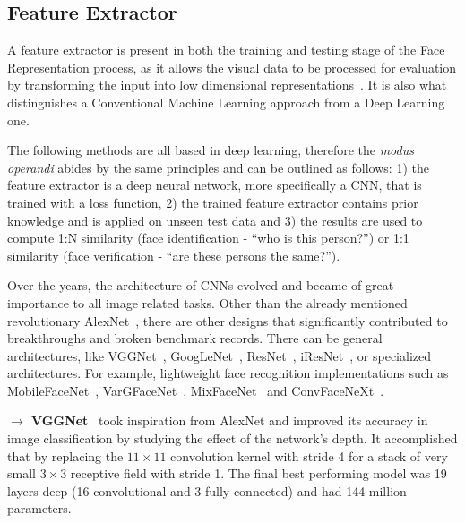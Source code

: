 \documentclass[class=report, crop=false, a4paper, 12pt]{standalone}
\begin{document}
\subsection{Feature Extractor}
A feature extractor is present in both the training and testing stage of the Face Representation process, as it allows the visual data to be processed for evaluation by transforming the input into low dimensional representations~\autocite{lecunGradientBasedLearningApplied1998}. It is also what distinguishes a Conventional Machine Learning approach from a Deep Learning one.  
\par The following methods are all based in deep learning, therefore the \textit{modus operandi} abides by the same principles and can be outlined as follows: 1) the feature extractor is a deep neural network, more specifically a CNN, that is trained with a loss function, 2) the trained feature extractor contains prior knowledge and is applied on unseen test data and 3) the results are used to compute 1:N similarity (face identification - ``who is this person?'') or 1:1 similarity (face verification - ``are these persons the same?'').
\par Over the years, the architecture of CNNs evolved and became of great importance to all image related tasks. Other than the already mentioned revolutionary AlexNet~\autocite{krizhevskyImageNetClassificationDeep2012}, there are other designs that significantly contributed to breakthroughs and broken benchmark records. There can be general architectures, like VGGNet~\autocite{simonyanVERYDEEPCONVOLUTIONAL2015}, GoogLeNet~\autocite{szegedyGoingDeeperConvolutions2014}, ResNet~\autocite{heDeepResidualLearning2016}, iResNet~\autocite{dutaImprovedResidualNetworks2021}, or specialized architectures. For example, lightweight face recognition implementations such as MobileFaceNet~\autocite{chenMobileFaceNetsEfficientCNNs2018}, VarGFaceNet~\autocite{yanVarGFaceNetEfficientVariable2019}, MixFaceNet~\autocite{boutrosMixFaceNetsExtremelyEfficient2021} and ConvFaceNeXt~\autocite{hooConvFaceNeXtLightweightNetworks2022}.

\vspace{\baselineskip}
\noindent\textbf{$\rightarrow$ VGGNet}~\autocite{simonyanVERYDEEPCONVOLUTIONAL2015} took inspiration from AlexNet and improved its accuracy in image classification by studying the effect of the network's depth. It accomplished that by replacing the $11\times 11$ convolution kernel with stride 4 for a stack of very small $3\times 3$ receptive field with stride 1. The final best performing model was 19 layers deep (16 convolutional and 3 fully-connected) and had 144 million parameters.
\end{document}
